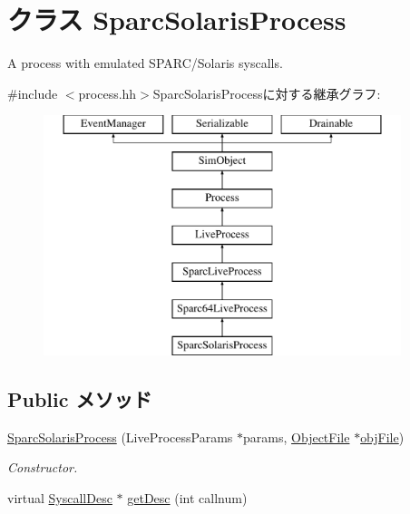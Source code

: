 \hypertarget{classSparcISA_1_1SparcSolarisProcess}{
\section{クラス SparcSolarisProcess}
\label{classSparcISA_1_1SparcSolarisProcess}
}


A process with emulated SPARC/Solaris syscalls.  


{\ttfamily \#include $<$process.hh$>$}SparcSolarisProcessに対する継承グラフ:\begin{figure}[H]
\begin{center}
\leavevmode
\includegraphics[height=7cm]{classSparcISA_1_1SparcSolarisProcess}
\end{center}
\end{figure}
\subsection*{Public メソッド}
\begin{DoxyCompactItemize}
\item 
\hyperlink{classSparcISA_1_1SparcSolarisProcess_a45c41956df37f9c80048847e39d7e444}{SparcSolarisProcess} (LiveProcessParams $\ast$params, \hyperlink{classObjectFile}{ObjectFile} $\ast$\hyperlink{classLiveProcess_ab6cfcfa7903c66267b3e0351c3caa809}{objFile})
\begin{DoxyCompactList}\small\item\em Constructor. \item\end{DoxyCompactList}\item 
virtual \hyperlink{classSyscallDesc}{SyscallDesc} $\ast$ \hyperlink{classSparcISA_1_1SparcSolarisProcess_aebbff609a7235342925445690acf5ee8}{getDesc} (int callnum)
\end{DoxyCompactItemize}
